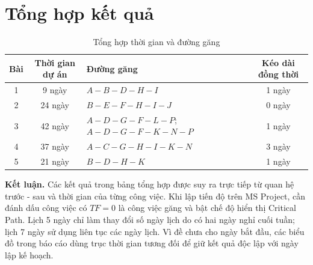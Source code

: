 \documentclass[12pt,a4paper]{article}
\begin{document}
\clearpage

\clearpage

\clearpage

\clearpage

\clearpage

\clearpage

\section{Tổng hợp kết quả}

\begin{table}[H]\centering
\caption{Tổng hợp thời gian và đường găng}
\small
\begin{tabular}{c|c|>{\centering\arraybackslash}p{7.2cm}|c}
\toprule
\textbf{Bài} & \textbf{Thời gian dự án} & \textbf{Đường găng} & \textbf{Kéo dài đồng thời}\\
\midrule
1 & 9 ngày & $A-B-D-H-I$ & 1 ngày\\
2 & 24 ngày & $B-E-F-H-I-J$ & 0 ngày\\
3 & 42 ngày & \parbox[c]{7.2cm}{\centering $A-D-G-F-L-P$;\\[-1pt] $A-D-G-F-K-N-P$} & 1 ngày\\
4 & 37 ngày & $A-C-G-H-I-K-N$ & 3 ngày\\
5 & 21 ngày & $B-D-H-K$ & 1 ngày\\
\bottomrule
\end{tabular}
\end{table}

\textbf{Kết luận.} Các kết quả trong bảng tổng hợp được suy ra trực tiếp từ
quan hệ trước - sau và thời gian của từng công việc. Khi lập tiến độ trên
MS Project, cần đánh dấu công việc có $TF=0$ là công việc găng và bật chế độ
hiển thị Critical Path. Lịch 5 ngày chỉ làm thay đổi số ngày lịch do có hai
ngày nghỉ cuối tuần; lịch 7 ngày sử dụng liên tục các ngày lịch. Vì đề chưa
cho ngày bắt đầu, các biểu đồ trong báo cáo dùng trục thời gian tương đối để
giữ kết quả độc lập với ngày lập kế hoạch.
\end{document}
